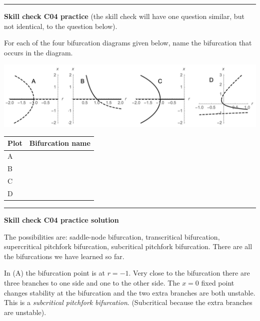 \documentclass[12pt,letterpaper,noanswers]{exam}
\begin{document}
\vspace{4in}

\vspace{0.2cm}
\hrule
\vspace{0.2cm}

\noindent\textbf{Skill check C04 practice} (the skill check will have one question similar, but not identical, to the question below).


\begin{questions}
\item For each of the four bifurcation diagrams given below, name the bifurcation that occurs in the diagram.

\includegraphics[width=\linewidth]{img/S22-bifurcation-skill.png}


\bgroup
\def\arraystretch{2}
\begin{tabular}{|l|p{10cm}|}
\hline
Plot     & \hspace{0.5cm} Bifurcation name \\
\hline\hline
 A    & \\
 \hline
 B & \\
 \hline
 C & \\
 \hline
 D & \\
 \hline
\end{tabular}
\egroup
\end{questions}

\vspace{0.2cm}
\hrule
\vspace{0.2cm}
\noindent\textbf{Skill check C04 practice solution} 

The possibilities are: saddle-node bifurcation, transcritical bifurcation, supercritical pitchfork bifurcation, subcritical pitchfork bifurcation.  There are all the bifurcations we have learned so far.

In (A) the bifurcation point is at $r = -1$.  Very close to the bifurcation there are three branches to one side and one to the other side.  The $x=0$ fixed point changes stability at the bifurcation and the two extra branches are both unstable.  This is a \emph{subcritical pitchfork bifurcation}.  (Subcritical because the extra branches are unstable).
\end{document}
